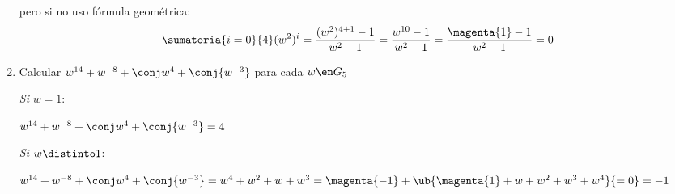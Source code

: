 \begin{enumerate}[label=\alph*)]
          pero si no uso fórmula geométrica:
        $$
        \sumatoria{i = 0}{4} (w^2)^i  =
        \frac{(w^2)^{4 + 1} - 1}{w^2 - 1} =
        \frac{w^{10} - 1}{w^2 - 1} =
        \frac{\magenta{1} - 1}{w^2 - 1} = 0
        $$

  \item Calcular $w^{14} + w^{-8} + \conj w^4 + \conj{w^{-3}}$ para cada $w \en G_5$

        \separadorCorto
        \textit{Si} $w = 1$: \par
        $w^{14} + w^{-8} + \conj w^4 + \conj{w^{-3}} = 4$

        \textit{Si} $w \distinto 1$: \par
        $w^{14} + w^{-8} + \conj w^4 + \conj{w^{-3}} =
          w^4 + w^2 + w + w^3 =
          \magenta{-1} + \ub{\magenta{1} + w + w^2 + w^3 + w^4}{= 0} = -1 $

\end{enumerate}
